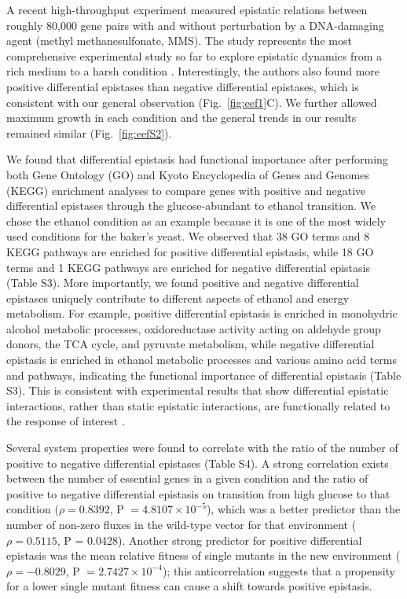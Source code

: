 \documentclass[10pt]{article}
\newcommand{\Fig}{Fig.}
\newcommand{\citep}{\cite}
\begin{document}
A recent high-throughput experiment measured epistatic relations
between roughly 80,000 gene pairs with and without perturbation by a
DNA-damaging agent (methyl methanesulfonate, MMS). The study
represents the most comprehensive experimental study so far to explore
epistatic dynamics from a rich medium to a harsh condition
\citep{Bandyopadhyay2011}. Interestingly, the authors also found more
positive differential
epistases than negative differential epistases, which is consistent
with our general observation (\Fig~\ref{fig:eef1}C). We further allowed maximum
growth in each condition and the general trends in our results
remained similar (\Fig~\ref{fig:eefS2}).

We found that differential epistasis had functional importance after
performing both Gene Ontology (GO) and Kyoto Encyclopedia of Genes and
Genomes (KEGG) enrichment analyses to compare genes with positive and
negative differential epistases through the glucose-abundant to
ethanol transition. We chose the ethanol condition as an example
because it is one of the most widely used conditions for the baker's
yeast. We observed that 38 GO terms and 8 KEGG pathways
are enriched for positive differential epistasis, while 18 GO terms
and 1 KEGG pathways are enriched for negative differential epistasis
(Table S3). More importantly, we found positive and negative
differential epistases uniquely contribute to different aspects of
ethanol and energy metabolism. For example, positive differential
epistasis is enriched in monohydric alcohol metabolic processes,
oxidoreductase activity acting on aldehyde group donors, the TCA
cycle, and pyruvate metabolism, while negative differential epistasis
is enriched in ethanol metabolic processes and various amino acid
terms and pathways, indicating the functional importance of
differential epistasis (Table S3). This is consistent with
experimental results that show differential epistatic interactions,
rather than static epistatic interactions, are functionally related to
the response of interest \citep{Bandyopadhyay2011}.

Several system properties were found to correlate with the ratio of
the number of positive to negative differential epistases (Table
S4). A strong correlation exists between the number of essential genes
in a given condition and the ratio of positive to negative
differential epistasis on transition from high glucose to that
condition ($\rho = 0.8392$, P $=4.8107 \times 10^{-5}$), which was a better predictor
than the number of non-zero fluxes in the wild-type vector for that
environment ($\rho = 0.5115$, P = 0.0428). Another strong predictor for
positive differential epistasis was the mean relative fitness of
single mutants in the new environment ($\rho = -0.8029$, P $= 2.7427 \times 10^{-4}$);
this anticorrelation suggests that a propensity for a lower single
mutant fitness can cause a shift towards positive epistasis.
\end{document}
